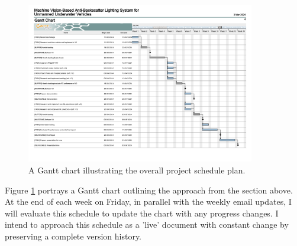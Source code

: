 \begin{figure}[h]
    \centering
    \includegraphics[width=0.89\textwidth]{assets/gantt_chart.png}
    \caption{A Gantt chart illustrating the overall project schedule plan.}
    \label{fig:gantt_chart}
\end{figure}

Figure \ref{fig:gantt_chart} portrays a Gantt chart outlining the approach from the section above. At the end of each week on Friday, in parallel with the weekly email updates, I will evaluate this schedule to update the chart with any progress changes. I intend to approach this schedule as a 'live' document with constant change by preserving a complete version history.
